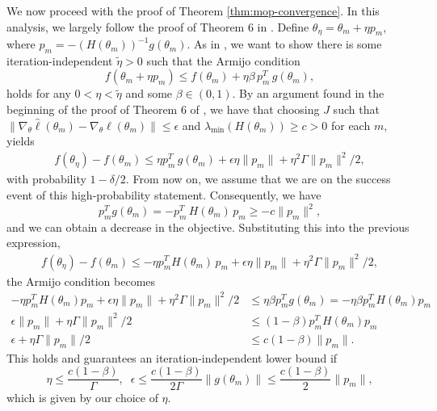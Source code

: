 We now proceed with the proof of Theorem \ref{thm:mop-convergence}.
In this analysis, we largely follow the proof of Theorem 6 in \cite{mahoney16}.
Define $\theta_\eta = \theta_m + \eta p_m$, where $p_m=-(H(\theta_m))^{-1}g(\theta_m)$. 
As in \cite{mahoney16}, we want to show there is some iteration-independent $\tilde{\eta}>0$ such that the Armijo condition
\begin{equation}
    f(\theta_m+\eta p_m) \leq f(\theta_m) + \eta\beta \, p_m^T \, g(\theta_m),
\end{equation}
holds for any $0< \eta < \tilde{\eta}$ and some $\beta \in (0,1)$.
By an argument found in the beginning of the proof of Theorem 6 of \cite{mahoney16}, we have that choosing $J$ such that $\|\nabla_\theta\hat{\ell}(\theta_m) - \nabla_\theta \ell(\theta_m)\| \leq \epsilon$ and $\lambda_{\min}(H(\theta_m)) \geq c>0$ for each $m$, yields
\begin{align}
    f(\theta_\eta)-f(\theta_m) \leq \eta p_m^T\, g(\theta_m) + \epsilon\eta\|p_m\| + \eta^2 \Gamma \|p_m\|^2 / 2,
\end{align}
with probability $1-\delta/2$. 
From now on, we assume that we are on the success event of this high-probability statement. 
Consequently, we have
\begin{equation}
    p_m^Tg(\theta_m) = -p_m^T\, H(\theta_m)\, p_m \geq -c\|p_m\|^2,
\end{equation}
and we can obtain a decrease in the objective. 
Substituting this into the previous expression,
\begin{align}
    f(\theta_\eta)-f(\theta_m) \leq -\eta p_m^TH(\theta_m)\, p_m + \epsilon\eta\|p_m\| + \eta^2 \Gamma \|p_m\|^2 / 2,
\end{align}
the Armijo condition becomes
\begin{align}
    -\eta p_m^TH(\theta_m)p_m + \epsilon\eta\|p_m\| + \eta^2 \Gamma \|p_m\|^2 / 2 &\leq \eta \beta p_m^Tg(\theta_m) = - \eta \beta p_m^TH(\theta_m)p_m \\
    \epsilon\|p_m\| + \eta \Gamma \|p_m\|^2 / 2 &\leq (1- \beta) p_m^TH(\theta_m)p_m \\
    \epsilon + \eta \Gamma \|p_m\| / 2 &\leq c(1- \beta) \|p_m\|.
\end{align}
This holds and guarantees an iteration-independent lower bound if 
\begin{equation}
    \eta \leq \frac{c(1-\beta)}{\Gamma}, \;\; \epsilon \leq \frac{c(1-\beta)}{2\Gamma}\|g(\theta_m)\| \leq \frac{c(1-\beta)}{2}\|p_m\|,
\end{equation}
which is given by our choice of $\eta$.
